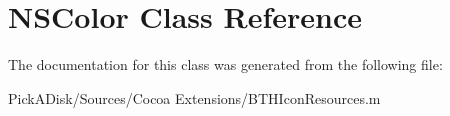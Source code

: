 \hypertarget{class_n_s_color}{
\section{NSColor Class Reference}
\label{class_n_s_color}
}


The documentation for this class was generated from the following file:\begin{DoxyCompactItemize}
\item 
PickADisk/Sources/Cocoa Extensions/BTHIconResources.m\end{DoxyCompactItemize}
